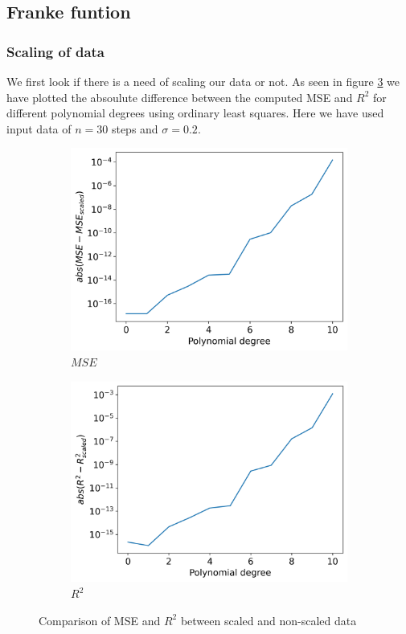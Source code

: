 \documentclass[12pt]{article}
\begin{document}
\subsection{Franke funtion}
\subsubsection{Scaling of data}
We first look if there is a need of scaling our data or not. As seen in figure \ref{fig:compare_scale} we have plotted the absoulute difference between the computed MSE and $R^2$ for different polynomial degrees using ordinary least squares. Here we have used input data of $n=30$ steps and $\sigma=0.2$.
\begin{figure}[H]
  \begin{subfigure}{.5\textwidth}
    \centering
    \includegraphics[width=\textwidth]{../figures/compare_scale_mse.png}
    \caption{$MSE$}
    \label{fig:}
  \end{subfigure}
  \begin{subfigure}{.5\textwidth}
    \centering
    \includegraphics[width=\textwidth]{../figures/compare_scale_r2.png}
    \caption{$R^2$}
    \label{fig:}
  \end{subfigure}
  \caption{Comparison of MSE and $R^2$ between scaled and non-scaled data}
  \label{fig:compare_scale}
\end{figure}
\end{document}

